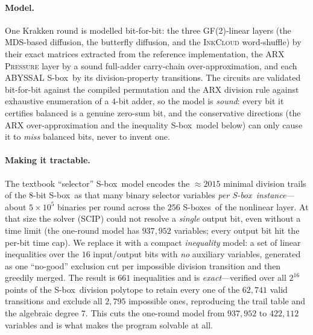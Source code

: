 \documentclass[11pt]{article}
\newcommand{\sbx}{S\nobreakdash-box}
\newcommand{\sbxes}{S\nobreakdash-boxes}
\begin{document}
\paragraph{Model.} One Krakken round is modelled bit-for-bit: the three
GF(2)-linear layers (the \textsc{MDS}-based diffusion, the butterfly diffusion,
and the \textsc{InkCloud} word-shuffle) by their exact matrices extracted from
the reference implementation, the ARX \textsc{Pressure} layer by a sound
full-adder carry-chain over-approximation, and each ABYSSAL \sbx\ by its
division-property transitions. The circuits are validated bit-for-bit against the
compiled permutation and the ARX division rule against exhaustive enumeration of a
$4$-bit adder, so the model is \emph{sound}: every bit it certifies balanced is a
genuine zero-sum bit, and the conservative directions (the ARX over-approximation
and the inequality \sbx\ model below) can only cause it to \emph{miss} balanced
bits, never to invent one.

\paragraph{Making it tractable.} The textbook ``selector'' \sbx\ model encodes
the $\approx\!2015$ minimal division trails of the $8$-bit \sbx\ as that many
binary selector variables \emph{per \sbx\ instance}---about $5\times10^{5}$
binaries per round across the $256$ \sbxes\ of the nonlinear layer. At that size
the solver (SCIP) could not resolve a \emph{single} output bit, even without a
time limit (the one-round model has $937{,}952$ variables; every output bit hit
the per-bit time cap). We replace it with a compact \emph{inequality} model: a set
of linear inequalities over the $16$ input/output bits with \emph{no} auxiliary
variables, generated as one ``no-good'' exclusion cut per impossible division
transition and then greedily merged. The result is $661$ inequalities and is
\emph{exact}---verified over all $2^{16}$ points of the \sbx\ division polytope to
retain every one of the $62{,}741$ valid transitions and exclude all $2{,}795$
impossible ones, reproducing the trail table and the algebraic degree $7$. This
cuts the one-round model from $937{,}952$ to $422{,}112$ variables and is what
makes the program solvable at all.
\end{document}
